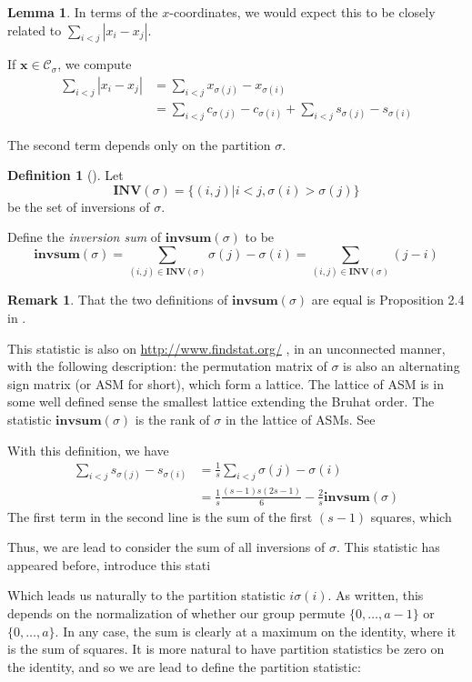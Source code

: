 \documentclass{amsart}[12pt]
\theoremstyle{definition}
\newtheorem{lemma}[dummy]{Lemma}
\newtheorem{definition}[dummy]{Definition}
\newtheorem{remark}[dummy]{Remark}
\newcommand{\invsum}{\mathbf{invsum}}
\newcommand{\INV}{\mathbf{INV}}
\begin{document}
\begin{lemma}
In terms of the $x$-coordinates, we would expect this to be closely related to $\sum_{i<j}|x_i-x_j|$.

If $\mathbf{x}\in \mathcal{C}_\sigma$, we compute
\begin{align*}
\sum_{i<j} |x_i-x_j|&=\sum_{i<j} x_{\sigma(j)}-x_{\sigma(i)}\\
&=\sum_{i<j} c_{\sigma(j)}-c_{\sigma(i)}+\sum_{i<j}s_{\sigma(j)}-s_{\sigma(i)} \end{align*}

The second term depends only on the partition $\sigma$.

\begin{definition}[\cite{SU}] Let $$\INV(\sigma)=\{(i,j)|i<j,\sigma(i)>\sigma(j)\}$$ be the set of inversions of $\sigma$.

Define the \emph{inversion sum} of $\invsum(\sigma)$ to be
$$\invsum(\sigma)=\sum_{(i,j)\in\INV(\sigma)}
\sigma(j)-\sigma(i)=\sum_{(i,j)\in\INV(\sigma)} (j-i)$$
\end{definition}

\begin{remark}
That the two definitions of $\invsum(\sigma)$ are equal is Proposition 2.4 in \cite{SU}.

This statistic is also on \url{http://www.findstat.org/} , in an
unconnected manner, with the following description: the permutation
matrix of $\sigma$ is also an alternating sign matrix (or ASM for
short), which form a lattice.  The lattice of ASM is in some well
defined sense the smallest lattice extending the Bruhat order.  The
statistic $\invsum(\sigma)$ is the rank of $\sigma$ in the lattice of
ASMs.  See \cite{}
\end{remark}

With this definition, we have
\begin{align*}\sum_{i<j}s_{\sigma(j)}-s_{\sigma(i)} &=\frac{1}{s}\sum_{i<j}\sigma(j)-\sigma(i)\\
&=\frac{1}{s}\frac{(s-1)s(2s-1)}{6}-\frac{2}{s}\invsum(\sigma)
\end{align*}
The first term in the second line is the sum of the first $(s-1)$
squares, which



Thus, we are lead to consider the sum of all inversions of $\sigma$.
This statistic has appeared before, \cite{SU} introduce this stati






Which leads us naturally to the partition statistic $i\sigma(i)$.  As written, this depends on the normalization of whether our group permute $\{0,\dots,a-1\}$ or $\{0,\dots,a\}$.  In any case, the sum is clearly at a maximum on the identity,  where it is the sum of squares.  It is more natural to have partition statistics be zero on the identity, and so we are lead to define the partition statistic:


\end{lemma}
\end{document}
